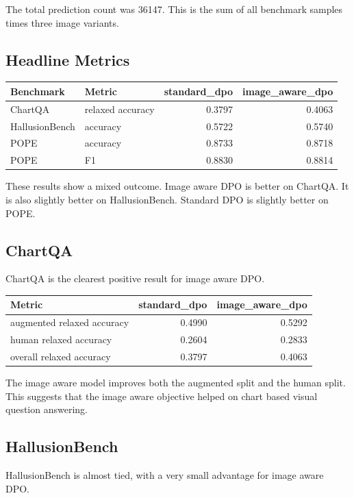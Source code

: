 \documentclass{article}
\begin{document}
The total prediction count was 36147.
This is the sum of all benchmark samples times three image variants.

\subsection{Headline Metrics}
\begin{center}
\begin{tabular}{llrr}
\toprule
Benchmark & Metric & standard\_dpo & image\_aware\_dpo \\
\midrule
ChartQA & relaxed accuracy & 0.3797 & 0.4063 \\
HallusionBench & accuracy & 0.5722 & 0.5740 \\
POPE & accuracy & 0.8733 & 0.8718 \\
POPE & F1 & 0.8830 & 0.8814 \\
\bottomrule
\end{tabular}
\end{center}

These results show a mixed outcome.
Image aware DPO is better on ChartQA.
It is also slightly better on HallusionBench.
Standard DPO is slightly better on POPE.

\subsection{ChartQA}
ChartQA is the clearest positive result for image aware DPO.

\begin{center}
\begin{tabular}{lrr}
\toprule
Metric & standard\_dpo & image\_aware\_dpo \\
\midrule
augmented relaxed accuracy & 0.4990 & 0.5292 \\
human relaxed accuracy & 0.2604 & 0.2833 \\
overall relaxed accuracy & 0.3797 & 0.4063 \\
\bottomrule
\end{tabular}
\end{center}

The image aware model improves both the augmented split and the human split.
This suggests that the image aware objective helped on chart based visual question answering.

\subsection{HallusionBench}
HallusionBench is almost tied, with a very small advantage for image aware DPO.
\end{document}
